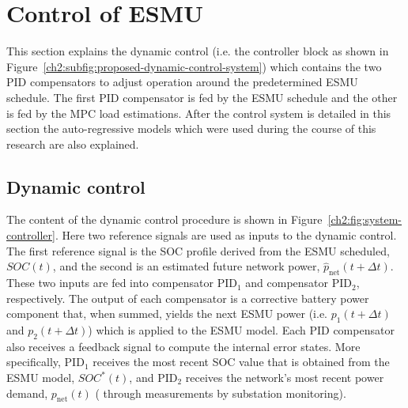 \section{Control of ESMU}
\label{ch2:sec:control-of-esmu}



This section explains the dynamic control (i.e. the controller block as shown in Figure~\ref{ch2:subfig:proposed-dynamic-control-system}) which contains the two PID compensators to adjust operation around the predetermined ESMU schedule.
The first PID compensator is fed by the ESMU schedule and the other is fed by the MPC load estimations.
After the control system is detailed in this section the auto-regressive models which were used during the course of this research are also explained.

\subsection{Dynamic control}

The content of the dynamic control procedure is shown in Figure~\ref{ch2:fig:system-controller}.
Here two reference signals are used as inputs to the dynamic control.
The first reference signal is the SOC profile derived from the ESMU scheduled, $SOC(t)$, and the second is an estimated future network power, $\hat{p}_\text{net}(t+\Delta t)$.
These two inputs are fed into compensator PID$_1$ and compensator PID$_2$, respectively.
The output of each compensator is a corrective battery power component that, when summed, yields the next ESMU power (i.e. $p_1(t+\Delta t)$ and $p_2(t+\Delta t)$) which is applied to the ESMU model.
Each PID compensator also receives a feedback signal to compute the internal error states.
More specifically, PID$_1$ receives the most recent SOC value that is obtained from the ESMU model, $SOC^*(t)$, and PID$_2$ receives the network's most recent power demand, $p_\text{net}(t)$ ( through measurements by substation monitoring).

